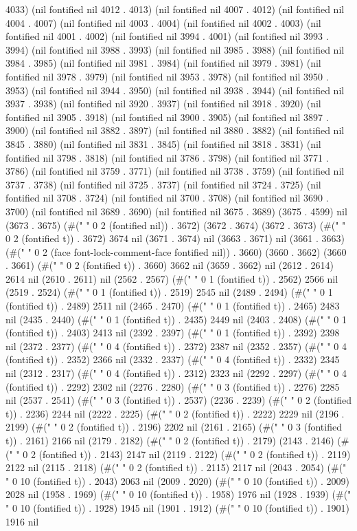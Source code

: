 4033) (nil fontified nil 4012 . 4013) (nil fontified nil 4007 . 4012) (nil fontified nil 4004 . 4007) (nil fontified nil 4003 . 4004) (nil fontified nil 4002 . 4003) (nil fontified nil 4001 . 4002) (nil fontified nil 3994 . 4001) (nil fontified nil 3993 . 3994) (nil fontified nil 3988 . 3993) (nil fontified nil 3985 . 3988) (nil fontified nil 3984 . 3985) (nil fontified nil 3981 . 3984) (nil fontified nil 3979 . 3981) (nil fontified nil 3978 . 3979) (nil fontified nil 3953 . 3978) (nil fontified nil 3950 . 3953) (nil fontified nil 3944 . 3950) (nil fontified nil 3938 . 3944) (nil fontified nil 3937 . 3938) (nil fontified nil 3920 . 3937) (nil fontified nil 3918 . 3920) (nil fontified nil 3905 . 3918) (nil fontified nil 3900 . 3905) (nil fontified nil 3897 . 3900) (nil fontified nil 3882 . 3897) (nil fontified nil 3880 . 3882) (nil fontified nil 3845 . 3880) (nil fontified nil 3831 . 3845) (nil fontified nil 3818 . 3831) (nil fontified nil 3798 . 3818) (nil fontified nil 3786 . 3798) (nil fontified nil 3771 . 3786) (nil fontified nil 3759 . 3771) (nil fontified nil 3738 . 3759) (nil fontified nil 3737 . 3738) (nil fontified nil 3725 . 3737) (nil fontified nil 3724 . 3725) (nil fontified nil 3708 . 3724) (nil fontified nil 3700 . 3708) (nil fontified nil 3690 . 3700) (nil fontified nil 3689 . 3690) (nil fontified nil 3675 . 3689) (3675 . 4599) nil (3673 . 3675) (#("  " 0 2 (fontified nil)) . 3672) (3672 . 3674) (3672 . 3673) (#("  " 0 2 (fontified t)) . 3672) 3674 nil (3671 . 3674) nil (3663 . 3671) nil (3661 . 3663) (#("  " 0 2 (face font-lock-comment-face fontified nil)) . 3660) (3660 . 3662) (3660 . 3661) (#("  " 0 2 (fontified t)) . 3660) 3662 nil (3659 . 3662) nil (2612 . 2614) 2614 nil (2610 . 2611) nil (2562 . 2567) (#(" " 0 1 (fontified t)) . 2562) 2566 nil (2519 . 2524) (#(" " 0 1 (fontified t)) . 2519) 2545 nil (2489 . 2494) (#(" " 0 1 (fontified t)) . 2489) 2511 nil (2465 . 2470) (#(" " 0 1 (fontified t)) . 2465) 2483 nil (2435 . 2440) (#(" " 0 1 (fontified t)) . 2435) 2449 nil (2403 . 2408) (#(" " 0 1 (fontified t)) . 2403) 2413 nil (2392 . 2397) (#(" " 0 1 (fontified t)) . 2392) 2398 nil (2372 . 2377) (#("    " 0 4 (fontified t)) . 2372) 2387 nil (2352 . 2357) (#("    " 0 4 (fontified t)) . 2352) 2366 nil (2332 . 2337) (#("    " 0 4 (fontified t)) . 2332) 2345 nil (2312 . 2317) (#("    " 0 4 (fontified t)) . 2312) 2323 nil (2292 . 2297) (#("    " 0 4 (fontified t)) . 2292) 2302 nil (2276 . 2280) (#("   " 0 3 (fontified t)) . 2276) 2285 nil (2537 . 2541) (#("   " 0 3 (fontified t)) . 2537) (2236 . 2239) (#("  " 0 2 (fontified t)) . 2236) 2244 nil (2222 . 2225) (#("  " 0 2 (fontified t)) . 2222) 2229 nil (2196 . 2199) (#("  " 0 2 (fontified t)) . 2196) 2202 nil (2161 . 2165) (#("   " 0 3 (fontified t)) . 2161) 2166 nil (2179 . 2182) (#("  " 0 2 (fontified t)) . 2179) (2143 . 2146) (#("  " 0 2 (fontified t)) . 2143) 2147 nil (2119 . 2122) (#("  " 0 2 (fontified t)) . 2119) 2122 nil (2115 . 2118) (#("  " 0 2 (fontified t)) . 2115) 2117 nil (2043 . 2054) (#("          " 0 10 (fontified t)) . 2043) 2063 nil (2009 . 2020) (#("          " 0 10 (fontified t)) . 2009) 2028 nil (1958 . 1969) (#("          " 0 10 (fontified t)) . 1958) 1976 nil (1928 . 1939) (#("          " 0 10 (fontified t)) . 1928) 1945 nil (1901 . 1912) (#("          " 0 10 (fontified t)) . 1901) 1916 nil 